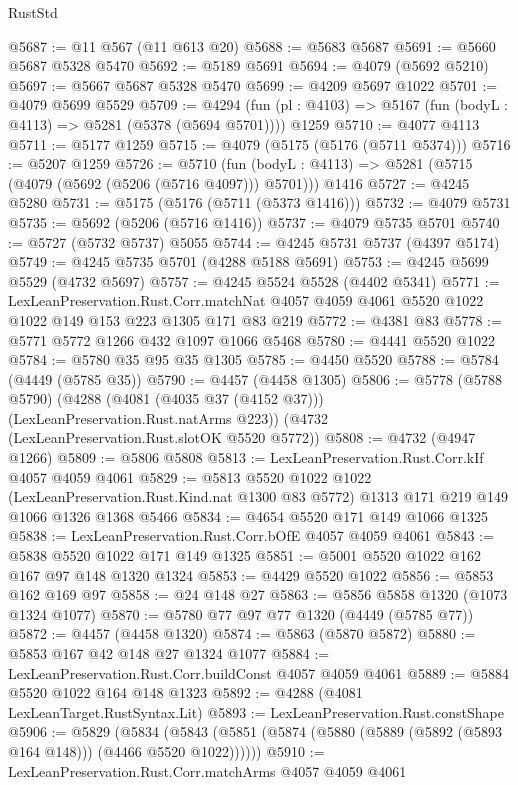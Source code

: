 \begin{lexlean}{RustStd}
\begin{coremodule}
@5687 := @11 @567 (@11 @613 @20)
@5688 := @5683 @5687
@5691 := @5660 @5687 @5328 @5470
@5692 := @5189 @5691
@5694 := @4079 (@5692 @5210)
@5697 := @5667 @5687 @5328 @5470
@5699 := @4209 @5697 @1022
@5701 := @4079 @5699 @5529
@5709 := @4294
    (fun (pl : @4103) => @5167 (fun (bodyL : @4113) => @5281 (@5378 (@5694 @5701))))
    @1259
@5710 := @4077 @4113
@5711 := @5177 @1259
@5715 := @4079 (@5175 (@5176 (@5711 @5374)))
@5716 := @5207 @1259
@5726 := @5710
    (fun (bodyL : @4113) => @5281 (@5715 (@4079 (@5692 (@5206 (@5716 @4097))) @5701)))
    @1416
@5727 := @4245 @5280
@5731 := @5175 (@5176 (@5711 (@5373 @1416)))
@5732 := @4079 @5731
@5735 := @5692 (@5206 (@5716 @1416))
@5737 := @4079 @5735 @5701
@5740 := @5727 (@5732 @5737) @5055
@5744 := @4245 @5731 @5737 (@4397 @5174)
@5749 := @4245 @5735 @5701 (@4288 @5188 @5691)
@5753 := @4245 @5699 @5529 (@4732 @5697)
@5757 := @4245 @5524 @5528 (@4402 @5341)
@5771 := LexLeanPreservation.Rust.Corr.matchNat
    @4057
    @4059
    @4061
    @5520
    @1022
    @1022
    @149
    @153
    @223
    @1305
    @171
    @83
    @219
@5772 := @4381 @83
@5778 := @5771 @5772 @1266 @432 @1097 @1066 @5468
@5780 := @4441 @5520 @1022
@5784 := @5780 @35 @95 @35 @1305
@5785 := @4450 @5520
@5788 := @5784 (@4449 (@5785 @35))
@5790 := @4457 (@4458 @1305)
@5806 := @5778
    (@5788 @5790)
    (@4288 (@4081 (@4035 @37 (@4152 @37))) (LexLeanPreservation.Rust.natArms @223))
    (@4732 (LexLeanPreservation.Rust.slotOK @5520 @5772))
@5808 := @4732 (@4947 @1266)
@5809 := @5806 @5808
@5813 := LexLeanPreservation.Rust.Corr.kIf @4057 @4059 @4061
@5829 := @5813
    @5520
    @1022
    @1022
    (LexLeanPreservation.Rust.Kind.nat @1300 @83 @5772)
    @1313
    @171
    @219
    @149
    @1066
    @1326
    @1368
    @5466
@5834 := @4654 @5520 @171 @149 @1066 @1325
@5838 := LexLeanPreservation.Rust.Corr.bOfE @4057 @4059 @4061
@5843 := @5838 @5520 @1022 @171 @149 @1325
@5851 := @5001 @5520 @1022 @162 @167 @97 @148 @1320 @1324
@5853 := @4429 @5520 @1022
@5856 := @5853 @162 @169 @97
@5858 := @24 @148 @27
@5863 := @5856 @5858 @1320 (@1073 @1324 @1077)
@5870 := @5780 @77 @97 @77 @1320 (@4449 (@5785 @77))
@5872 := @4457 (@4458 @1320)
@5874 := @5863 (@5870 @5872)
@5880 := @5853 @167 @42 @148 @27 @1324 @1077
@5884 := LexLeanPreservation.Rust.Corr.buildConst @4057 @4059 @4061
@5889 := @5884 @5520 @1022 @164 @148 @1323
@5892 := @4288 (@4081 LexLeanTarget.RustSyntax.Lit)
@5893 := LexLeanPreservation.Rust.constShape
@5906 := @5829
    (@5834 (@5843 (@5851 (@5874 (@5880 (@5889 (@5892 (@5893 @164 @148))) (@4466 @5520 @1022))))))
@5910 := LexLeanPreservation.Rust.Corr.matchArms @4057 @4059 @4061

\end{coremodule}
\end{lexlean}
